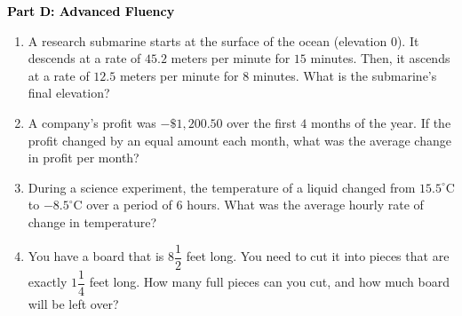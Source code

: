\documentclass[12pt, letterpaper, fleqn]{article}
\begin{document}
\newpage

\begin{tcolorbox}[colback=customteal!20]
\large\textcolor{black}{\textbf{Part D: Advanced Fluency}}
\end{tcolorbox}

\vspace{3mm}

\begin{enumerate}[itemsep=5.5cm, leftmargin=0.6cm, resume]
\item A research submarine starts at the surface of the ocean (elevation $0$). It descends at a rate of $45.2$ meters per minute for $15$ minutes. Then, it ascends at a rate of $12.5$ meters per minute for $8$ minutes. What is the submarine's final elevation?
\item A company's profit was $-\$1,200.50$ over the first $4$ months of the year. If the profit changed by an equal amount each month, what was the average change in profit per month?
\item During a science experiment, the temperature of a liquid changed from $15.5^\circ$C to $-8.5^\circ$C over a period of $6$ hours. What was the average hourly rate of change in temperature?
\item You have a board that is $8\dfrac{1}{2}$ feet long. You need to cut it into pieces that are exactly $1\dfrac{1}{4}$ feet long. How many full pieces can you cut, and how much board will be left over?
\end{enumerate}
\end{document}
